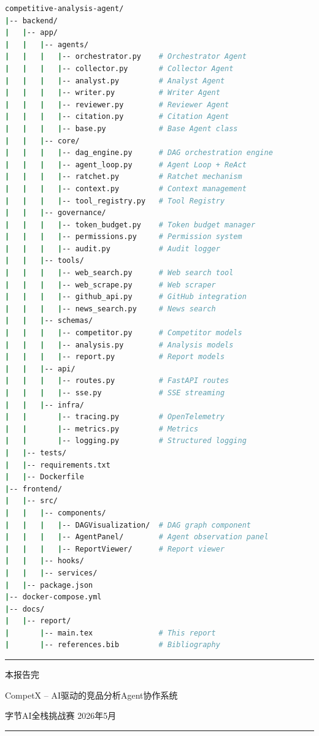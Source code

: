 \documentclass[12pt,a4paper]{ctexrep}
\begin{document}
\begin{lstlisting}[language=bash,caption=项目代码结构]
competitive-analysis-agent/
|-- backend/
|   |-- app/
|   |   |-- agents/
|   |   |   |-- orchestrator.py    # Orchestrator Agent
|   |   |   |-- collector.py       # Collector Agent
|   |   |   |-- analyst.py         # Analyst Agent
|   |   |   |-- writer.py          # Writer Agent
|   |   |   |-- reviewer.py        # Reviewer Agent
|   |   |   |-- citation.py        # Citation Agent
|   |   |   |-- base.py            # Base Agent class
|   |   |-- core/
|   |   |   |-- dag_engine.py      # DAG orchestration engine
|   |   |   |-- agent_loop.py      # Agent Loop + ReAct
|   |   |   |-- ratchet.py         # Ratchet mechanism
|   |   |   |-- context.py         # Context management
|   |   |   |-- tool_registry.py   # Tool Registry
|   |   |-- governance/
|   |   |   |-- token_budget.py    # Token budget manager
|   |   |   |-- permissions.py     # Permission system
|   |   |   |-- audit.py           # Audit logger
|   |   |-- tools/
|   |   |   |-- web_search.py      # Web search tool
|   |   |   |-- web_scrape.py      # Web scraper
|   |   |   |-- github_api.py      # GitHub integration
|   |   |   |-- news_search.py     # News search
|   |   |-- schemas/
|   |   |   |-- competitor.py      # Competitor models
|   |   |   |-- analysis.py        # Analysis models
|   |   |   |-- report.py          # Report models
|   |   |-- api/
|   |   |   |-- routes.py          # FastAPI routes
|   |   |   |-- sse.py             # SSE streaming
|   |   |-- infra/
|   |       |-- tracing.py         # OpenTelemetry
|   |       |-- metrics.py         # Metrics
|   |       |-- logging.py         # Structured logging
|   |-- tests/
|   |-- requirements.txt
|   |-- Dockerfile
|-- frontend/
|   |-- src/
|   |   |-- components/
|   |   |   |-- DAGVisualization/  # DAG graph component
|   |   |   |-- AgentPanel/        # Agent observation panel
|   |   |   |-- ReportViewer/      # Report viewer
|   |   |-- hooks/
|   |   |-- services/
|   |-- package.json
|-- docker-compose.yml
|-- docs/
|   |-- report/
|       |-- main.tex               # This report
|       |-- references.bib         # Bibliography
\end{lstlisting}

\vspace{1cm}
\begin{center}
{\color{primary}\rule{0.6\linewidth}{1pt}}

\vspace{0.5cm}
{\large\color{secondary} 本报告完}

\vspace{0.3cm}
{\small\color{gray} CompetX -- AI驱动的竞品分析Agent协作系统}

{\small\color{gray} 字节AI全栈挑战赛 \quad 2026年5月}

{\color{primary}\rule{0.6\linewidth}{1pt}}
\end{center}
\end{document}
